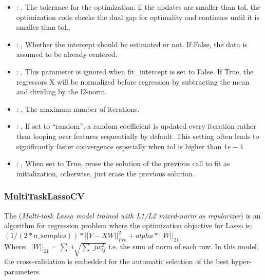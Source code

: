 \begin{itemize}
    \item {}: , 
      The tolerance for the optimization: if the updates are smaller
      than tol, the optimization code checks the dual gap for optimality and
      continues until it is smaller than tol..

    \item {}: , 
      Whether the intercept should be estimated or not. If False,
      the data is assumed to be already centered.

    \item {}: , 
      This parameter is ignored when fit\_intercept is set to False. If True,
      the regressors X will be normalized before regression by subtracting the mean and
      dividing by the l2-norm.

    \item {}: , 
      The maximum number of iterations.

    \item {}: , 
      If set to ``random'', a random coefficient is updated every iteration
      rather than looping over features sequentially by default. This setting
      often leads to significantly faster convergence especially when tol is higher than $1e-4$

    \item {}: , 
      When set to True, reuse the solution of the previous call
      to fit as initialization, otherwise, just erase the previous solution.
  \end{itemize}


\subsubsection{MultiTaskLassoCV}
  The  (\textit{Multi-task Lasso model trained
  with L1/L2 mixed-norm as regularizer}) is an algorithm for regression problem
  where the optimization objective for Lasso is:                         $(1 / (2 * n\_samples)) *
  ||Y - XW||^2_{Fro} + alpha * ||W||_{21}$                         \\Where:
  $||W||_{21} = \sum\_i \sqrt{\sum\_j w_{ij}^2}$                         i.e. the sum of norm of each
  row.                         In this model, the cross-validation is embedded for the automatic
  selection                         of the best hyper-parameters.

